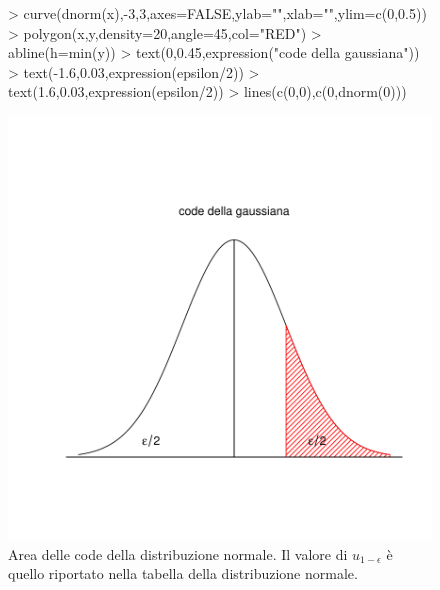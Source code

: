 \documentclass[onecolumn,11pt]{book}
\begin{document}
\begin{figure}\begin{center}
\begin{Schunk}
\begin{Sinput}
> curve(dnorm(x),-3,3,axes=FALSE,ylab="",xlab="",ylim=c(0,0.5))
> polygon(x,y,density=20,angle=45,col="RED")
> abline(h=min(y))
> text(0,0.45,expression("code della gaussiana"))
> text(-1.6,0.03,expression(epsilon/2))
> text(1.6,0.03,expression(epsilon/2))
> lines(c(0,0),c(0,dnorm(0))) 
\end{Sinput}
\end{Schunk}
\includegraphics{statisticaconR-364}
\caption{ Area delle code della distribuzione normale. Il valore di $u_{1-\epsilon}$ \`e quello riportato nella  tabella della distribuzione normale. }
\label{normaletratto}
\end{center}
\end{figure}
\end{document}
